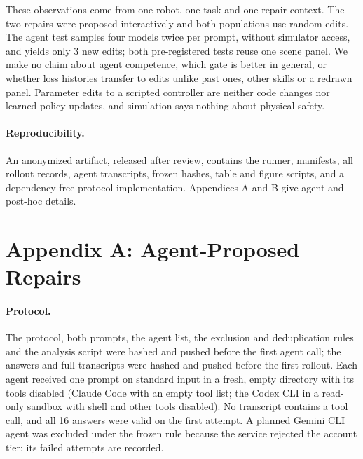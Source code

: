 \documentclass[letterpaper]{article} %
\begin{document}
These observations come from one robot, one task and one repair context. The two repairs were proposed interactively and both populations use random edits. The agent test samples four models twice per prompt, without simulator access, and yields only 3 new edits; both pre-registered tests reuse one scene panel. We make no claim about agent competence, which gate is better in general, or whether loss histories transfer to edits unlike past ones, other skills or a redrawn panel. Parameter edits to a scripted controller are neither code changes nor learned-policy updates, and simulation says nothing about physical safety.

\paragraph{Reproducibility.} An anonymized artifact, released after review, contains the runner, manifests, all rollout records, agent transcripts, frozen hashes, table and figure scripts, and a dependency-free protocol implementation. Appendices A and B give agent and post-hoc details.



\appendix
\section{Appendix A: Agent-Proposed Repairs}
\paragraph{Protocol.} The protocol, both prompts, the agent list, the exclusion and deduplication rules and the analysis script were hashed and pushed before the first agent call; the answers and full transcripts were hashed and pushed before the first rollout. Each agent received one prompt on standard input in a fresh, empty directory with its tools disabled (Claude Code with an empty tool list; the Codex CLI in a read-only sandbox with shell and other tools disabled). No transcript contains a tool call, and all 16 answers were valid on the first attempt. A planned Gemini CLI agent was excluded under the frozen rule because the service rejected the account tier; its failed attempts are recorded.
\end{document}

